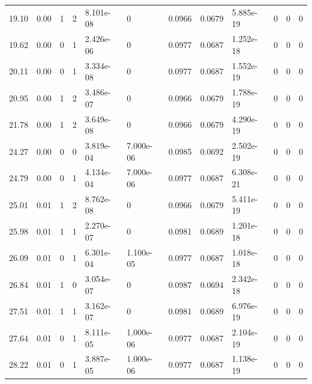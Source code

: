 \documentclass[preview]{standalone}
\begin{document}
{{\begin{tabular}{L{1.2cm}C{1.2cm} C{0.3cm}C{0.5cm} C{1.4cm}C{1.4cm} C{1.4cm}C{1.4cm} C{1.6cm}C{1.6cm} C{1.6cm}C{1.6cm}}
  19.10  &  0.00  & 1     &  2 &  8.101e-08  & 0  &  0.0966&   0.0679& 5.885e-19 & 0   &  0 & 0  \\ 
  19.62  &  0.00  & 0     &  1 &  2.426e-06  & 0  &  0.0977&   0.0687& 1.252e-18 & 0   &  0 & 0  \\ 
  20.11  &  0.00  & 0     &  1 &  3.334e-08  & 0  &  0.0977&   0.0687& 1.552e-19 & 0   &  0 & 0  \\ 
  20.95  &  0.00  & 1     &  2 &  3.486e-07  & 0  &  0.0966&   0.0679& 1.788e-19 & 0   &  0 & 0  \\ 
  21.78  &  0.00  & 1     &  2 &  3.649e-08  & 0  &  0.0966&   0.0679& 4.290e-19 & 0   &  0 & 0  \\ 
  24.27  &  0.00  & 0     &  0 &  3.819e-04  & 7.000e-06  &  0.0985&   0.0692& 2.502e-19 & 0   &  0 & 0  \\ 
  24.79  &  0.00  & 0     &  1 &  4.134e-04  & 7.000e-06  &  0.0977&   0.0687& 6.308e-21 & 0   &  0 & 0  \\ 
  25.01  &  0.01  & 1     &  2 &  8.762e-08  & 0  &  0.0966&   0.0679& 5.411e-19 & 0   &  0 & 0  \\ 
  25.98  &  0.01  & 1     &  1 &  2.270e-07  & 0  &  0.0981&   0.0689& 1.201e-18 & 0   &  0 & 0  \\ 
  26.09  &  0.01  & 0     &  1 &  6.301e-04  & 1.100e-05  &  0.0977&   0.0687& 1.018e-18 & 0   &  0 & 0  \\ 
  26.84  &  0.01  & 1     &  0 &  3.054e-07  & 0  &  0.0987&   0.0694& 2.342e-18 & 0   &  0 & 0  \\ 
  27.51  &  0.01  & 1     &  1 &  3.162e-07  & 0  &  0.0981&   0.0689& 6.976e-19 & 0   &  0 & 0  \\ 
  27.64  &  0.01  & 0     &  1 &  8.111e-05  & 1.000e-06  &  0.0977&   0.0687& 2.104e-19 & 0   &  0 & 0  \\ 
  28.22  &  0.01  & 0     &  1 &  3.887e-05  & 1.000e-06  &  0.0977&   0.0687& 1.138e-19 & 0   &  0 & 0  \\ 
\hline 
\end{tabular} 

}}
\end{document}
